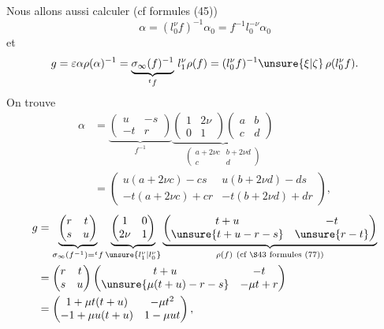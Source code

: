 Nous allons aussi calculer  (cf formules (45))
\[
\alpha=(l_0^\nu f)^{-1}\alpha_0=f^{-1}l_0^{-\nu}\alpha_0
\]
et
\[
g=\varepsilon\alpha\rho(\alpha)^{-1}
=\underbrace{\sigma_\infty(f)^{-1}}_{{}^t f}\,l_1^\nu\rho(f)
=(l_0^\nu f)^{-1}\unsure{\xi|\zeta}\,\rho(l_0^\nu f).
\]
On trouve
\[
\tag{64}
\begin{aligned}
\alpha&=\underbrace{\begin{pmatrix}u&-s\\-t&r\end{pmatrix}}_{f^{-1}}
\underbrace{\begin{pmatrix}1&2\nu\\0&1\end{pmatrix}
\begin{pmatrix}a&b\\c&d\end{pmatrix}}_{\begin{pmatrix}a+2\nu c&b+2\nu d\\c&d\end{pmatrix}}\\
&=\begin{pmatrix}u(a+2\nu c)-cs&u(b+2\nu d)-ds\\-t(a+2\nu c)+cr&-t(b+2\nu d)+dr\end{pmatrix},
\end{aligned}
\]
\[
\begin{aligned}
g&=\underbrace{\begin{pmatrix}r&t\\s&u\end{pmatrix}}_{\sigma_\infty(f^{-1})={}^t f}
\underbrace{\begin{pmatrix}1&0\\2\nu&1\end{pmatrix}}_{\unsure{l_1^\nu|l_0^\nu}}
\underbrace{\begin{pmatrix}t+u&-t\\\unsure{t+u-r-s}&\unsure{r-t}\end{pmatrix}}_{\rho(f)\ (\text{cf \S43 formules }(77))}\\
&=\begin{pmatrix}r&t\\s&u\end{pmatrix}
\begin{pmatrix}t+u&-t\\\unsure{\mu(t+u)-r-s}&-\mu t+r\end{pmatrix}\\
&=\begin{pmatrix}1+\mu t(t+u)&-\mu t^2\\-1+\mu u(t+u)&1-\mu ut\end{pmatrix},
\end{aligned}
\]
